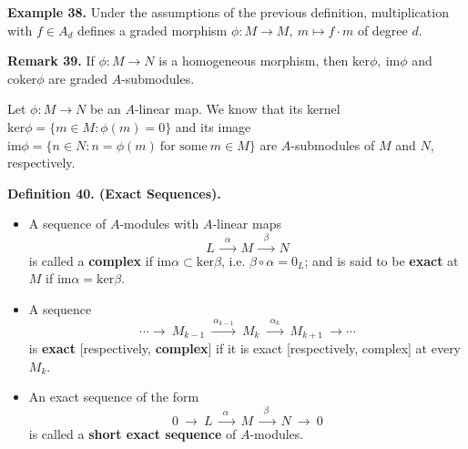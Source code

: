 \documentclass[12pt,a4paper,footinclude=true,headinclude=true]{scrbook} %
\newenvironment{definition}[2][Definition]
    { \begin{mdframed}[backgroundcolor=gray!20] \textbf{#1 #2.}\ }
    {  \end{mdframed}}
\newenvironment{remark}[2][Remark]
    { \begin{mdframed}[backgroundcolor=gray!20] \textbf{#1 #2.} }
    {  \end{mdframed}}
\newenvironment{example}[2][Example]
    { \begin{mdframed}[backgroundcolor=gray!20] \textbf{#1 #2.} }
    {  \end{mdframed}}
\begin{document}
\begin{example}{38}
    Under the assumptions of the previous definition, multiplication with $f\in A_d$ defines a graded morphism $\phi:M\to M,\ m\mapsto f\cdot m$ of degree $d$.
\end{example}

\begin{remark}{39}
    If $\phi:M\to N$ is a homogeneous morphism, then $\mathrm{ker}\phi,\ \mathrm{im}\phi$ and $\mathrm{coker}\phi$ are graded $A$-submodules.
\end{remark}
\vspace{5mm}
Let $\phi:M\to N$ be an $A$-linear map. We know that its kernel $\mathrm{ker}\phi= \{m\in M:\phi(m)=0\}$ and its image $\mathrm{im}\phi=\{n\in N:n=\phi(m)\ \text{for some}\ m\in M\}$ are $A$-submodules of $M$ and $N$, respectively.
\begin{definition}{40. (Exact Sequences)}
    \begin{itemize}
        \item A sequence of $A$-modules with $A$-linear maps
        \begin{equation*}
            L\ \xrightarrow{~~\alpha~~}\ M\ \xrightarrow{~~\beta~~}\ N 
        \end{equation*}
        is called a \textbf{complex} if $\mathrm{im}\alpha\subset\mathrm{ker}\beta$, i.e. $\beta\circ\alpha=0_L$; and is said to be \textbf{exact} at $M$ if $\mathrm{im}\alpha=\mathrm{ker}\beta$.
        \item A sequence 
        \begin{equation*}
            \cdots\xrightarrow{~~~~~~}\ M_{k-1}\ \xrightarrow{~\alpha_{k-1}~}\
            M_{k}\ \xrightarrow{~~\alpha_{k}~~}\ M_{k+1}\ \xrightarrow{~~~~~~}\cdots
        \end{equation*}
        is \textbf{exact} [respectively, \textbf{complex}] if it is exact [respectively, complex] at every $M_k$.
        \item An exact sequence of the form
        \begin{equation*}
            0\ \xrightarrow{~~~~~~}\ L\ \xrightarrow{~~\alpha~~~}\ M\ \xrightarrow{~~\beta~~~}\ N\ \xrightarrow{~~~~~~}\ 0
        \end{equation*}
        is called a \textbf{short exact sequence} of $A$-modules.
    \end{itemize}
\end{definition}
\end{document}
